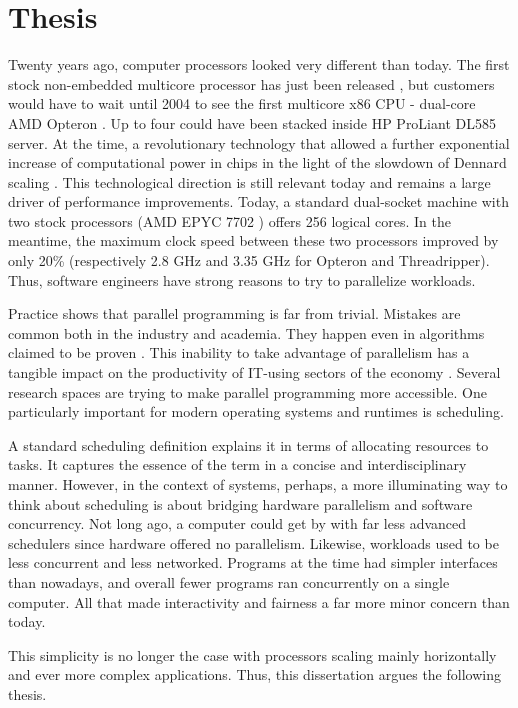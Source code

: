 \documentclass[12pt,a4paper,twoside]{report}
\begin{document}
\section{Thesis}
\label{section:thesis}
Twenty years ago, computer processors looked very different than today. The first stock non-embedded multicore processor has just been released \cite{Stallings}, but customers would have to wait until 2004 to see the first multicore x86 CPU - dual-core AMD Opteron \cite{AMDAnnou13:online}. Up to four could have been stacked inside HP ProLiant DL585 server. At the time, a revolutionary technology that allowed a further exponential increase of computational power in chips \cite{mooremulti} in the light of the slowdown of Dennard scaling \cite{Bohr2007}. This technological direction is still relevant today and remains a large driver of performance improvements. Today, a standard dual-socket machine with two stock processors (AMD EPYC 7702 \cite{2ndGenAM1:online}) offers 256 logical cores. In the meantime, the maximum clock speed between these two processors improved by only 20\% (respectively 2.8 GHz and 3.35 GHz for Opteron and Threadripper). Thus, software engineers have strong reasons to try to parallelize workloads. 

Practice shows that parallel programming is far from trivial. Mistakes are common both in the industry and academia. They happen even in algorithms claimed to be proven \cite{Norris2013}. This inability to take advantage of parallelism has a tangible impact on the productivity of IT-using sectors of the economy \cite{Khan2018}. Several research spaces are trying to make parallel programming more accessible. One particularly important for modern operating systems and runtimes is scheduling. 

A standard scheduling definition explains it in terms of allocating resources to tasks. It captures the essence of the term in a concise and interdisciplinary manner. However, in the context of systems, perhaps, a more illuminating way to think about scheduling is about bridging hardware parallelism and software concurrency. Not long ago, a computer could get by with far less advanced schedulers since hardware offered no parallelism. Likewise, workloads used to be less concurrent and less networked. Programs at the time had simpler interfaces than nowadays, and overall fewer programs ran concurrently on a single computer. All that made interactivity and fairness a far more minor concern than today. 

This simplicity is no longer the case with processors scaling mainly horizontally and ever more complex applications. Thus, this dissertation argues the following thesis. 
\end{document}
